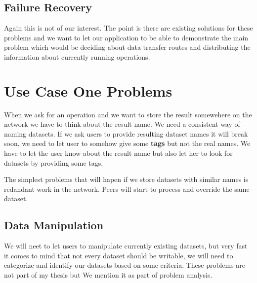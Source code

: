 \subsection{Failure Recovery}
Again this is not of our interest. The point is there are existing solutions for these problems and we want to let our application to be able to demonstrate the main problem which would be deciding about data transfer routes and distributing the information about currently running operations.

\section{Use Case One Problems}
When we ask for an operation and we want to store the result somewehere on the network we have to think about the result name. 
We need a consistent way of naming datasets. If we ask users to provide resulting dataset names it will break soon, we need to 
let user to somehow give some \textbf{tags} but not the real names. We have to let the user know about the result name but also
let her to look for datasets by providing some tags.

The simplest problems that will hapen if we store datasets with similar names is redandant work in the network. Peers will start 
to process and override the same dataset.

\subsection{Data Manipulation}
We will neet to let users to manipulate currently existing datasets, but very fast it comes to mind that not every dataset should be
writable, we will need to categorize and identify our datasets based on some criteria. These problems are not part of my thesis but
We mention it as part of problem analysis.

